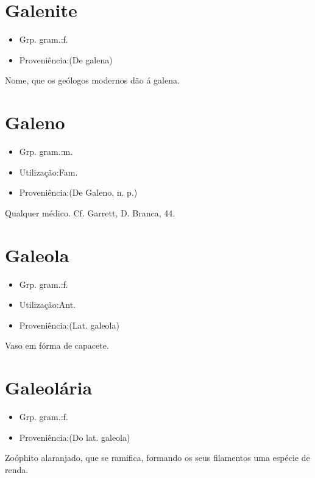 \section{Galenite}
\begin{itemize}
\item {Grp. gram.:f.}
\end{itemize}
\begin{itemize}
\item {Proveniência:(De \textunderscore galena\textunderscore )}
\end{itemize}
Nome, que os geólogos modernos dão á galena.
\section{Galeno}
\begin{itemize}
\item {Grp. gram.:m.}
\end{itemize}
\begin{itemize}
\item {Utilização:Fam.}
\end{itemize}
\begin{itemize}
\item {Proveniência:(De \textunderscore Galeno\textunderscore , n. p.)}
\end{itemize}
Qualquer médico. Cf. Garrett, \textunderscore D. Branca\textunderscore , 44.
\section{Galeola}
\begin{itemize}
\item {Grp. gram.:f.}
\end{itemize}
\begin{itemize}
\item {Utilização:Ant.}
\end{itemize}
\begin{itemize}
\item {Proveniência:(Lat. \textunderscore galeola\textunderscore )}
\end{itemize}
Vaso em fórma de capacete.
\section{Galeolária}
\begin{itemize}
\item {Grp. gram.:f.}
\end{itemize}
\begin{itemize}
\item {Proveniência:(Do lat. \textunderscore galeola\textunderscore )}
\end{itemize}
Zoóphito alaranjado, que se ramifica, formando os seus filamentos uma espécie de renda.
